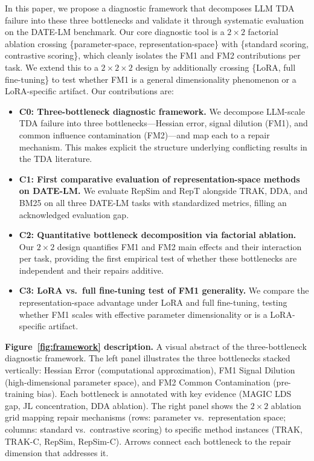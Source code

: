 \documentclass{article}
\begin{document}
In this paper, we propose a diagnostic framework that decomposes LLM TDA failure into these three bottlenecks and validate it through systematic evaluation on the DATE-LM benchmark. Our core diagnostic tool is a $2 \times 2$ factorial ablation crossing \{parameter-space, representation-space\} with \{standard scoring, contrastive scoring\}, which cleanly isolates the FM1 and FM2 contributions per task. We extend this to a $2 \times 2 \times 2$ design by additionally crossing \{LoRA, full fine-tuning\} to test whether FM1 is a general dimensionality phenomenon or a LoRA-specific artifact. Our contributions are:

\begin{itemize}
    \item \textbf{C0: Three-bottleneck diagnostic framework.} We decompose LLM-scale TDA failure into three bottlenecks---Hessian error, signal dilution (FM1), and common influence contamination (FM2)---and map each to a repair mechanism. This makes explicit the structure underlying conflicting results in the TDA literature.

    \item \textbf{C1: First comparative evaluation of representation-space methods on DATE-LM.} We evaluate RepSim and RepT alongside TRAK, DDA, and BM25 on all three DATE-LM tasks with standardized metrics, filling an acknowledged evaluation gap.

    \item \textbf{C2: Quantitative bottleneck decomposition via factorial ablation.} Our $2 \times 2$ design quantifies FM1 and FM2 main effects and their interaction per task, providing the first empirical test of whether these bottlenecks are independent and their repairs additive.

    \item \textbf{C3: LoRA vs.\ full fine-tuning test of FM1 generality.} We compare the representation-space advantage under LoRA and full fine-tuning, testing whether FM1 scales with effective parameter dimensionality or is a LoRA-specific artifact.
\end{itemize}

\textbf{Figure~\ref{fig:framework} description.} A visual abstract of the three-bottleneck diagnostic framework. The left panel illustrates the three bottlenecks stacked vertically: Hessian Error (computational approximation), FM1 Signal Dilution (high-dimensional parameter space), and FM2 Common Contamination (pre-training bias). Each bottleneck is annotated with key evidence (MAGIC LDS gap, JL concentration, DDA ablation). The right panel shows the $2 \times 2$ ablation grid mapping repair mechanisms (rows: parameter vs.\ representation space; columns: standard vs.\ contrastive scoring) to specific method instances (TRAK, TRAK-C, RepSim, RepSim-C). Arrows connect each bottleneck to the repair dimension that addresses it.
\end{document}

